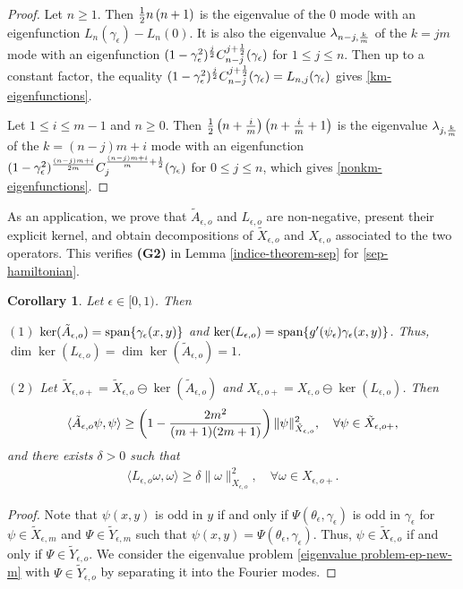 \documentclass[1 [leqno, 11pt]{amsart}
\numberwithin{equation}{section}
\let\ep=\epsilon
\def\gep{\gamma_\epsilon}
\newtheorem{Corollary}[Theorem]{Corollary}
\begin{document}
\begin{CJK*}{GBK}{song}
\begin{proof}
Let  $n\geq1$. Then ${1\over2}n\left( n+1\right)$  is the eigenvalue of the $0$ mode with
an eigenfunction   $L_{n}(\gamma_\ep)-L_{n}(0)$. It is also  the eigenvalue $\lambda_{n-j,{k\over m}}$ of the $k=jm$ mode with an eigenfunction
$(1-\gamma_\ep^2)^{j\over2}C_{n-j}^{j+{1\over2}}(\gamma_\ep)$ for $1\leq j\leq n$. Then up to a constant factor, the equality $(1-\gamma_\ep^2)^{j\over2}C_{n-j}^{j+{1\over2}}(\gamma_\ep)=L_{n,j}(\gamma_\ep)$ gives \eqref{km-eigenfunctions}.

Let $1\leq i\leq m-1$ and  $n\geq0$. Then  ${1\over2}\left(n+{i\over m}\right)\left( n+{i\over m}+1\right)$ is the eigenvalue $\lambda_{j,{k\over m}}$ of the $k=(n-j)m+i$ mode with an eigenfunction $(1-\gamma_\ep^2)^{(n-j)m+i\over2m}C_j^{{(n-j)m+i\over m}+{1\over2}}(\gamma_\ep)$ for  $0\leq j\leq  n$, which gives \eqref{nonkm-eigenfunctions}.
\end{proof}

As an application,
we prove that  $\tilde A_{\ep,o}$ and $L_{\ep,o}$ are  non-negative, present their explicit kernel,  and obtain  decompositions of
$\tilde X_{\ep,o}$ and $X_{\ep,o}$  associated to the two operators. This verifies  {\textbf{(G2)}} in Lemma \ref{indice-theorem-sep} for \eqref{sep-hamiltonian}.


\begin{Corollary}\label{A-L-dec-o}
 Let $\ep\in[0,1)$. Then

$(1)$ $\ker (\tilde A_{\ep,o})=\textup{span}\{\gamma_\ep(x,y)\}$ and $\ker (L_{\ep,o})=\textup{span}\{g'(\psi_\ep)\gamma_\ep(x,y)\}$. Thus,  $\dim \ker(L_{\ep,o})=\dim\ker (\tilde A_{\ep,o})=1$.

$(2)$ Let $\tilde X_{\ep,o+}=\tilde X_{\ep,o} \ominus\ker (\tilde A_{\ep,o})$ and $ X_{\ep,o+}= X_{\ep,o} \ominus\ker (L_{\ep,o})$. Then
\begin{align*}
\langle \tilde A_{\ep,o} \psi,\psi\rangle \geq \left(1-{2m^2\over (m+1)(2m+1)}\right) \| \psi\|_{\tilde X_{\ep,o}}^2, \quad\forall \psi\in \tilde X_{\ep,o+},
\end{align*}
and there exists $\delta>0$ such that
\begin{align*}
\langle L_{\ep,o} \omega,\omega\rangle \geq \delta \| \omega\|_{ X_{\ep,o}}^2, \quad \forall \omega\in  X_{\ep,o+}.
\end{align*}
\end{Corollary}
\begin{proof}
Note that $\psi(x,y)$ is odd in $y$ if and only if $\Psi(\theta_\ep, \gep)$ is odd in $\gep$ for $\psi \in \tilde{X}_{\ep,m}$ and $\Psi \in \tilde{Y}_{\ep,m}$ such that $\psi(x,y) = \Psi(\theta_\ep, \gamma_\ep)$. Thus, $\psi\in\tilde{X}_{\ep,o}$ if and only if $\Psi\in\tilde{Y}_{\ep,o}$. We consider the eigenvalue problem \eqref{eigenvalue problem-ep-new-m} with $\Psi \in \tilde{Y}_{\ep,o}$ by separating it into the Fourier modes.


\end{proof}
\end{CJK*}
\end{document}
